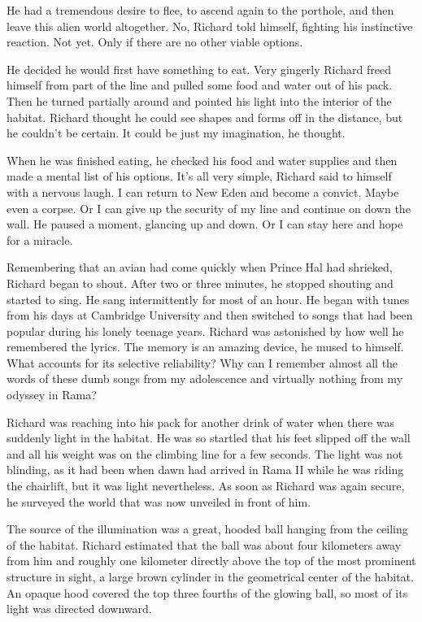 \documentclass[]{article}
\begin{document}
{He had a tremendous desire to flee, to ascend again to the porthole, and then leave this alien world altogether.  No, Richard told himself, fighting his instinctive reaction.  Not yet.  Only if there are no other viable options.

He decided he would first have something to eat.  Very gingerly Richard freed himself from part of the line and pulled some food and water out of his pack.  Then he turned partially around and pointed his light into the interior of the habitat.  Richard thought he could see shapes and forms off in the distance, but he couldn’t be certain.  It could be just my imagination, he thought.

When he was finished eating, he checked his food and water supplies and then made a mental list of his options.  It’s all very simple, Richard said to himself with a nervous laugh.  I can return to New Eden and become a convict.  Maybe even a corpse.  Or I can give up the security of my line and continue on down the wall.  He paused a moment, glancing up and down.  Or I can stay here and hope for a miracle.

Remembering that an avian had come quickly when Prince Hal had shrieked, Richard began to shout.  After two or three minutes, he stopped shouting and started to sing.  He sang intermittently for most of an hour.  He began with tunes from his days at Cambridge University and then switched to songs that had been popular during his lonely teenage years.  Richard was astonished by how well he remembered the lyrics.  The memory is an amazing device, he mused to himself.  What accounts for its selective reliability? Why can I remember almost all the words of these dumb songs from my adolescence and virtually nothing from my odyssey in Rama?

Richard was reaching into his pack for another drink of water when there was suddenly light in the habitat.  He was so startled that his feet slipped off the wall and all his weight was on the climbing line for a few seconds.  The light was not blinding, as it had been when dawn had arrived in Rama II while he was riding the chairlift, but it was light nevertheless.  As soon as Richard was again secure, he surveyed the world that was now unveiled in front of him.

The source of the illumination was a great, hooded ball hanging from the ceiling of the habitat.  Richard estimated that the ball was about four kilometers away from him and roughly one kilometer directly above the top of the most prominent structure in sight, a large brown cylinder in the geometrical center of the habitat.  An opaque hood covered the top three fourths of the glowing ball, so most of its light was directed downward.

}
\end{document}
